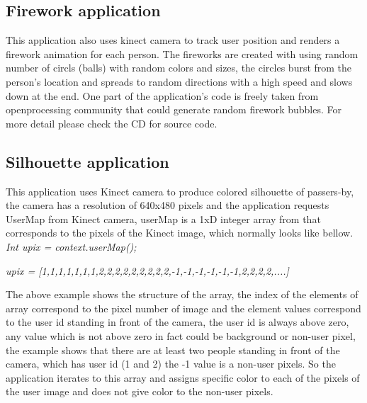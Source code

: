 \subsection{Firework application}
This application also uses kinect camera to track user position and renders a firework animation for each person.
The fireworks are created with using random number of circls (balls) with random colors and sizes, the circles burst from the person's location and spreads to random directions with a high speed and slows down at the end. One part of the application's code is freely taken from openprocessing community that could generate random firework bubbles.
For more detail please check the CD for source code.

\subsection{Silhouette application}
This application uses Kinect camera to produce colored silhouette of passers-by, the camera has a resolution of 640x480 pixels and the application requests UserMap from Kinect camera, userMap is a 1xD integer array from that corresponds to the pixels of the Kinect image, which normally looks like bellow. \\

\emph {Int upix = context.userMap();}

\emph{upix = [1,1,1,1,1,1,1,2,2,2,2,2,2,2,2,2,-1,-1,-1,-1,-1,-1,2,2,2,2,....]}

The above example shows the structure of the array, the index of the elements of array correspond to the pixel number of image and the element values correspond to the user id standing in front of the camera, the user id is always above zero, any value which is not above zero in fact could be background or non-user pixel, the example shows that there are at least two people standing in front of the camera, which has user id (1 and 2) the -1 value is a non-user pixels. 
So the application iterates to this array and assigns specific color to each of the pixels of the user image and does not give color to the non-user pixels. 


